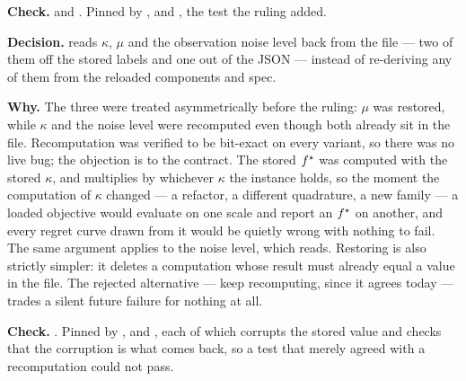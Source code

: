 \begin{sloppypar}
\textbf{Check.}  and
. Pinned by
,
 and
, the test
the ruling added.
\end{sloppypar}

\label{app:so:a4:r34}

\textbf{Decision.}  reads $\kappa$, $\mu$ and
the observation noise level back from the file --- two of them off the stored
labels and one out of the JSON --- instead of re-deriving any of them from the
reloaded components and spec.

\textbf{Why.} The three were treated asymmetrically before the ruling: $\mu$
was restored, while $\kappa$ and the noise level were recomputed even though
both already sit in the file. Recomputation was verified to be bit-exact on
every variant, so there was no live bug; the objection is to the contract. The
stored $f^\star$ was computed with the stored $\kappa$, and 
multiplies by whichever $\kappa$ the instance holds, so the moment the
computation of $\kappa$ changed --- a refactor, a different quadrature, a new
family --- a loaded objective would evaluate on one scale and report an
$f^\star$ on another, and every regret curve drawn from it would be quietly
wrong with nothing to fail. The same argument applies to the noise level, which
 reads. Restoring is also strictly simpler: it deletes a
computation whose result must already equal a value in the file. The rejected
alternative --- keep recomputing, since it agrees today --- trades a silent
future failure for nothing at all.

\begin{sloppypar}
\textbf{Check.} . Pinned by
,
and
,
each of which corrupts the stored value and checks that the corruption is what
comes back, so a test that merely agreed with a recomputation could not pass.
\end{sloppypar}

